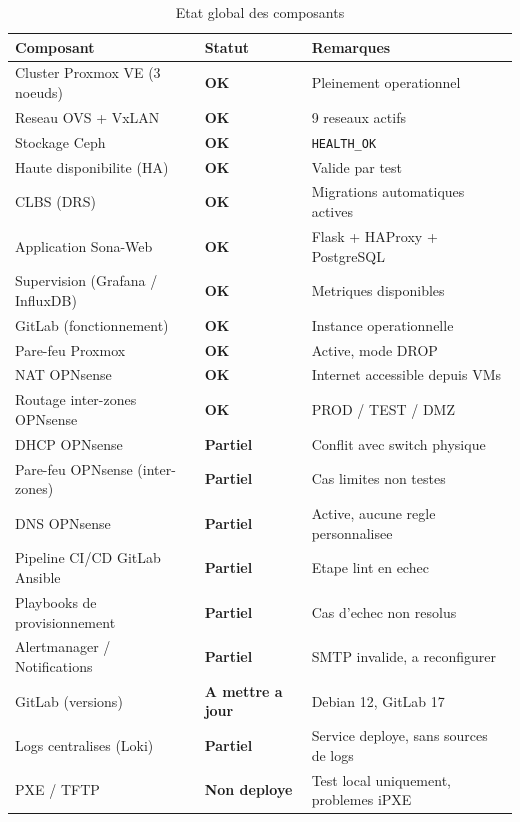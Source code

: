 \documentclass[a4paper,11pt]{article}
\begin{document}
\begin{table}[H]
  \caption{Etat global des composants}
  \centering
  \begin{tabular}{L{5.5cm}C{3cm}L{4.5cm}}
    \toprule
    \textbf{Composant} & \textbf{Statut} & \textbf{Remarques} \\
    \midrule
    Cluster Proxmox VE (3 noeuds) & \textcolor{vert}{\textbf{OK}} & Pleinement operationnel \\
    Reseau OVS + VxLAN            & \textcolor{vert}{\textbf{OK}} & 9 reseaux actifs \\
    Stockage Ceph                 & \textcolor{vert}{\textbf{OK}} & \texttt{HEALTH\_OK} \\
    Haute disponibilite (HA)      & \textcolor{vert}{\textbf{OK}} & Valide par test \\
    CLBS (DRS)                    & \textcolor{vert}{\textbf{OK}} & Migrations automatiques actives \\
    Application Sona-Web          & \textcolor{vert}{\textbf{OK}} & Flask + HAProxy + PostgreSQL \\
    Supervision (Grafana / InfluxDB) & \textcolor{vert}{\textbf{OK}} & Metriques disponibles \\
    GitLab (fonctionnement)       & \textcolor{vert}{\textbf{OK}} & Instance operationnelle \\
    Pare-feu Proxmox              & \textcolor{vert}{\textbf{OK}} & Active, mode DROP \\
    NAT OPNsense                  & \textcolor{vert}{\textbf{OK}} & Internet accessible depuis VMs \\
    Routage inter-zones OPNsense  & \textcolor{vert}{\textbf{OK}} & PROD / TEST / DMZ \\
    DHCP OPNsense                 & \textcolor{jaune}{\textbf{Partiel}} & Conflit avec switch physique \\
    Pare-feu OPNsense (inter-zones) & \textcolor{jaune}{\textbf{Partiel}} & Cas limites non testes \\
    DNS OPNsense                  & \textcolor{jaune}{\textbf{Partiel}} & Active, aucune regle personnalisee \\
    Pipeline CI/CD GitLab Ansible & \textcolor{jaune}{\textbf{Partiel}} & Etape lint en echec \\
    Playbooks de provisionnement  & \textcolor{jaune}{\textbf{Partiel}} & Cas d'echec non resolus \\
    Alertmanager / Notifications  & \textcolor{jaune}{\textbf{Partiel}} & SMTP invalide, a reconfigurer \\
    GitLab (versions)             & \textcolor{jaune}{\textbf{A mettre a jour}} & Debian 12, GitLab 17 \\
    Logs centralises (Loki)       & \textcolor{jaune}{\textbf{Partiel}} & Service deploye, sans sources de logs \\
    PXE / TFTP                    & \textcolor{rouge}{\textbf{Non deploye}} & Test local uniquement, problemes iPXE \\
    \bottomrule
  \end{tabular}
\end{table}
\end{document}
